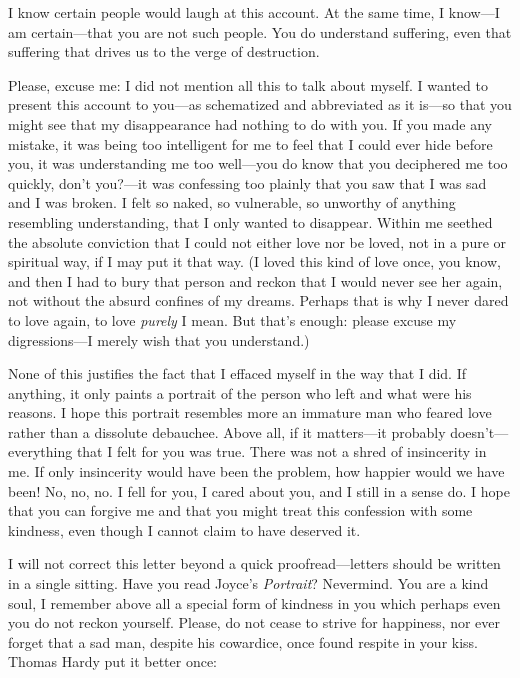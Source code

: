\documentclass[a4paper]{article}
\begin{document}
I know certain people would laugh at this account. At the same time, I know---I
am certain---that you are not such people. You do understand suffering, even
that suffering that drives us to the verge of destruction. 

Please, excuse me: I did not mention all this to talk about myself. I wanted to present this
account to you---as schematized and abbreviated as it is---so that you might see
that my disappearance had nothing to do with you. If you made any mistake, it
was being too intelligent for me to feel that I could ever hide before you, it
was understanding me too well---you do know that you deciphered me too quickly,
don't you?---it was confessing too plainly that you saw that I was sad and I was
broken. I felt so naked, so vulnerable, so unworthy of anything resembling
understanding, that I only wanted to disappear. Within me seethed the absolute
conviction that I could not either love nor be loved, not in a pure or
spiritual way, if I may put it that way. (I loved this kind of love once, you
know, and then I had to bury that person and reckon that I would never see her
again, not without the absurd confines of my dreams. Perhaps that is why I never
dared to love again, to love \textit{purely} I mean. But that's enough: please
excuse my digressions---I merely wish that you understand.)

None of this justifies the fact that I effaced myself in the way that I did. If
anything, it only paints a portrait of the person who left and what were his
reasons. I hope this portrait resembles more an immature man who feared love
rather than a dissolute debauchee. Above all, if it matters---it probably
doesn't---everything that I felt for you was true. There was not a shred of
insincerity in me. If only insincerity would have been the problem, how happier
would we have been! No, no, no. I fell for you, I cared about you, and I
still in a sense do. I hope that you can forgive me and that you might treat
this confession with some kindness, even though I cannot claim to have deserved
it.

I will not correct this letter beyond a quick proofread---letters should be
written in a single sitting. Have you read Joyce's \textit{Portrait}? Nevermind.
You are a kind soul, I remember above all a special form of kindness in you
which perhaps even you do not reckon yourself. Please, do not cease to strive
for happiness, nor ever forget that a sad man, despite his cowardice, once
found respite in your kiss. Thomas Hardy put it better once: 
\end{document}
